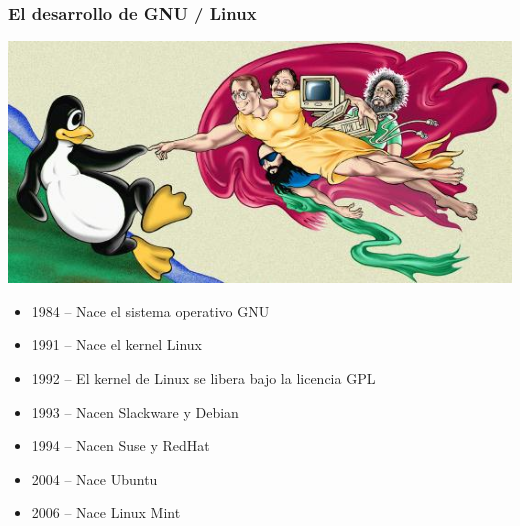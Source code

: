 \documentclass[hyperref={colorlinks}]{beamer}
\begin{document}
\begin{frame}
\frametitle{El desarrollo de GNU / Linux}
\begin{center}
    \includegraphics[width=.50\textwidth]{figs/tux21.png}
\end{center}
\begin{itemize}
\item 1984 -- Nace el sistema operativo GNU
\item 1991 -- Nace el kernel Linux
\item 1992 -- El kernel de Linux se libera bajo la licencia GPL
\item 1993 -- Nacen Slackware y Debian
\item 1994 -- Nacen Suse y RedHat
\item 2004 -- Nace Ubuntu
\item 2006 -- Nace Linux Mint
\end{itemize}
\end{frame}
\end{document}
